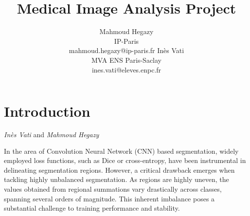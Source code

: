 \documentclass[onecolumn]{article}
\author{%
  Mahmoud Hegazy \\
  IP-Paris\\
  mahmoud.hegazy@ip-paris.fr
  \And
  Inès Vati \\
  MVA ENS Paris-Saclay \\
  ines.vati@eleves.enpc.fr\\
}
\title{Medical Image Analysis Project}
\begin{document}
\maketitle
\section{Introduction} 
\textit{Inès Vati} and \textit{Mahmoud Hegazy} 

In the area of Convolution Neural Network (CNN) based segmentation, widely employed loss functions, such as Dice or cross-entropy, have been instrumental in delineating segmentation regions. However, a critical drawback emerges when tackling highly unbalanced segmentation. As regions are highly uneven, the values obtained from regional summations vary drastically across classes, spanning several orders of magnitude. This inherent imbalance poses a substantial challenge to training performance and stability.


\end{document}
